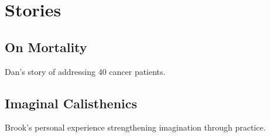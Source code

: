 \documentclass[12pt]{book}
\begin{document}

\chapter{Stories}

\section{On Mortality}

Dan's story of addressing 40 cancer patients.

\section{Imaginal Calisthenics}

Brook's personal experience strengthening imagination through practice.
\end{document}
